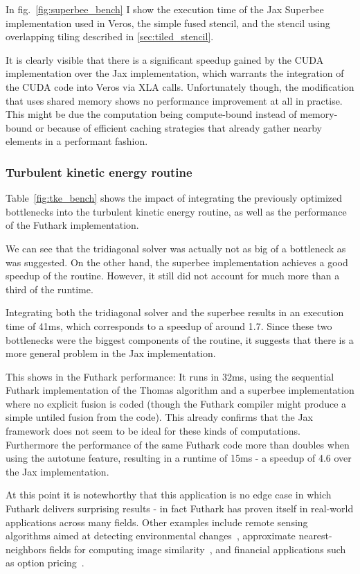 \documentclass[a4paper,oneside]{memoir}
\begin{document}
In fig.~\ref{fig:superbee_bench} I show the execution time of the Jax Superbee implementation used in Veros, the simple fused stencil, and the stencil using overlapping tiling described in \ref{sec:tiled_stencil}.

It is clearly visible that there is a significant speedup gained by the CUDA implementation over the Jax implementation, which warrants the integration of the CUDA code into Veros via XLA calls. Unfortunately though, the modification that uses shared memory shows no performance improvement at all in practise. This might be due the computation being compute-bound instead of memory-bound or because of efficient caching strategies that already gather nearby elements in a performant fashion.

\subsubsection{Turbulent kinetic energy routine}
Table~\ref{fig:tke_bench} shows the impact of integrating the previously optimized bottlenecks into the turbulent kinetic energy routine, as well as the performance of the Futhark implementation. 

We can see that the tridiagonal solver was actually not as big of a bottleneck as was suggested. On the other hand, the superbee implementation achieves a good speedup of the routine. However, it still did not account for much more than a third of the runtime. 

Integrating both the tridiagonal solver and the superbee results in an execution time of 41ms, which corresponds to a speedup of around 1.7. Since these two bottlenecks were the biggest components of the routine, it suggests that there is a more general problem in the Jax implementation.

This shows in the Futhark performance: It runs in 32ms, using the sequential Futhark implementation of the Thomas algorithm and a superbee implementation where no explicit fusion is coded (though the Futhark compiler might produce a simple untiled fusion from the code). This already confirms that the Jax framework does not seem to be ideal for these kinds of computations. Furthermore the performance of the same Futhark code more than doubles when using the autotune feature, resulting in a runtime of 15ms - a speedup of 4.6 over the Jax implementation.

At this point it is notewhorthy that this application is no edge case in which Futhark delivers surprising results - in fact Futhark has proven itself in real-world applications across many fields. Other examples include remote sensing algorithms aimed at detecting environmental changes~\cite{bfast}, approximate nearest-neighbors fields for computing image similarity~\cite{nnf-kd-tree}, and financial applications such as option pricing~\cite{option-pricing}.
\end{document}
